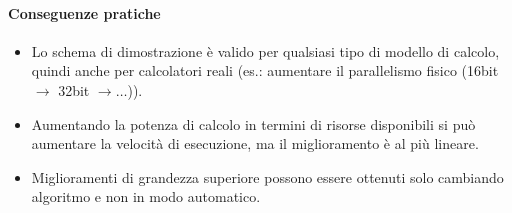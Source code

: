 \documentclass[10pt,a4paper]{article}
\begin{document}
\paragraph{Conseguenze pratiche}
\begin{itemize}
    \item Lo schema di dimostrazione \`e valido per qualsiasi tipo di modello di calcolo, quindi anche per calcolatori reali (es.: aumentare il parallelismo fisico (16bit $\rightarrow$ 32bit $\rightarrow \dots$)).
    \item Aumentando la potenza di calcolo in termini di risorse disponibili si pu\`o aumentare la velocit\`a di esecuzione, ma il miglioramento \`e al pi\`u lineare.
    \item Miglioramenti di grandezza superiore possono essere ottenuti solo cambiando algoritmo e non in modo automatico.
\end{itemize}
\end{document}
